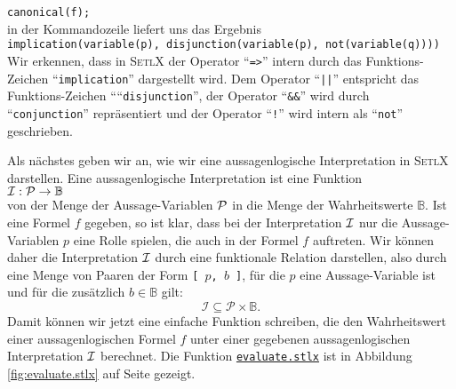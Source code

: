 \hspace*{1.3cm}
\texttt{canonical(f);}
\\[0.2cm]
in der Kommandozeile liefert uns das Ergebnis
\\[0.2cm]
\hspace*{1.3cm}
\texttt{implication(variable(p), disjunction(variable(p), not(variable(q))))}
\\[0.2cm]
Wir erkennen, dass in \textsc{SetlX} der Operator ``\texttt{=>}'' intern
durch das Funktions-Zeichen ``\texttt{implication}'' dargestellt wird.
Dem Operator ``\texttt{||}'' entspricht das Funktions-Zeichen ````\texttt{disjunction}'',
der Operator ``\texttt{\&\&}'' wird durch ``\texttt{conjunction}'' repr\"{a}sentiert und
der Operator ``\texttt{!}'' wird intern als  ``\texttt{not}'' geschrieben.

Als n\"{a}chstes geben wir an, wie wir eine aussagenlogische Interpretation in \textsc{SetlX}
darstellen.  Eine aussagenlogische Interpretation ist eine Funktion \\[0.2cm]
\hspace*{1.3cm} ${\cal I}: {\cal P} \rightarrow \mathbb{B}$ \\[0.2cm]
von der Menge der Aussage-Variablen ${\cal P}$ in die Menge der Wahrheitswerte 
$\mathbb{B}$.  Ist eine Formel $f$ gegeben, so ist klar, dass bei der
Interpretation ${\cal I}$ nur die Aussage-Variablen $p$ eine Rolle spielen,
die auch in der Formel $f$ auftreten.  Wir k\"{o}nnen daher die Interpretation
${\cal I}$ durch eine funktionale Relation darstellen, also durch eine Menge von
Paaren der Form \texttt{[ $p$, $b$ ]}, f\"{u}r die $p$ eine Aussage-Variable ist und f\"{u}r die zus\"{a}tzlich
$b \in \mathbb{B}$ gilt:
\[ \mathcal{I} \subseteq \mathcal{P} \times \mathbb{B}. \]
Damit k\"{o}nnen wir jetzt eine einfache Funktion schreiben, die den Wahrheitswert
einer aussagenlogischen Formel $f$ unter einer gegebenen aussagenlogischen
Interpretation ${\cal I}$ berechnet. Die Funktion
\href{https://github.com/karlstroetmann/Logik/blob/master/SetlX/evaluate.stlx}{\texttt{evaluate.stlx}}
ist in Abbildung \ref{fig:evaluate.stlx} auf Seite \pageref{fig:evaluate.stlx} gezeigt.


